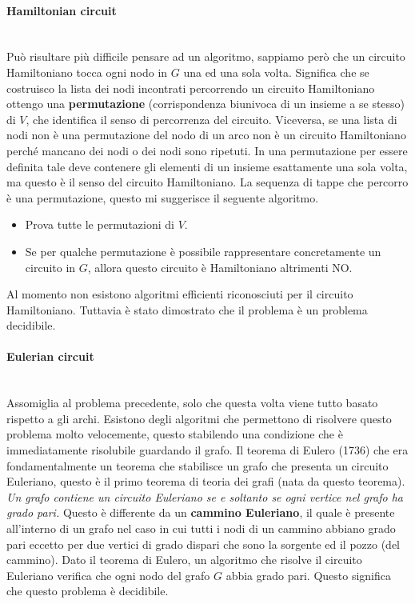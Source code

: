 \documentclass{article}
\begin{document}
\paragraph{Hamiltonian circuit}\mbox{}\\
Può risultare più difficile pensare ad un algoritmo, sappiamo però che un circuito
Hamiltoniano tocca ogni nodo in $G$ una ed una sola volta. Significa che
se costruisco la lista dei nodi incontrati percorrendo un circuito Hamiltoniano
ottengo una \textbf{permutazione} (corrispondenza biunivoca di un
insieme a se stesso) di $V$, che identifica il senso di percorrenza del circuito.
Viceversa, se una lista di nodi non è una permutazione
del nodo di un arco non è un circuito Hamiltoniano perché mancano dei nodi o
dei nodi sono ripetuti.
\newline\newline
In una permutazione per essere definita tale deve contenere gli elementi di un
insieme esattamente una sola volta, ma questo è il senso del circuito Hamiltoniano.
La sequenza di tappe che percorro è una permutazione, questo mi suggerisce il seguente algoritmo.
\begin{itemize}
    \item Prova tutte le permutazioni di $V$.
    \item Se per qualche permutazione è possibile rappresentare concretamente
          un circuito in $G$, allora questo circuito è Hamiltoniano altrimenti NO.
\end{itemize}
Al momento non esistono algoritmi efficienti riconosciuti per il circuito Hamiltoniano.
Tuttavia è stato dimostrato che il problema è un problema decidibile.

\paragraph{Eulerian circuit}\mbox{}\\
Assomiglia al problema precedente, solo che questa volta viene tutto basato rispetto a gli archi.
Esistono degli algoritmi che permettono di risolvere questo problema molto velocemente,
questo stabilendo una condizione che è immediatamente risolubile guardando il grafo.
Il teorema di Eulero (1736) che era fondamentalmente un teorema che stabilisce un
grafo che presenta un circuito Euleriano, questo è il primo teorema di teoria dei grafi (nata
da questo teorema).
\newline\newline
\textit{Un grafo contiene un circuito Euleriano se e soltanto se ogni vertice nel grafo ha grado
    pari.} Questo è differente da un \textbf{cammino Euleriano}, il quale è presente all'interno
di un grafo nel caso in cui tutti i nodi di un cammino abbiano grado pari eccetto per due
vertici di grado dispari che sono la sorgente ed il pozzo (del cammino). Dato il teorema di Eulero,
un algoritmo che risolve il circuito Euleriano verifica che ogni nodo del grafo $G$ abbia
grado pari. Questo significa che questo problema è decidibile.
\end{document}
